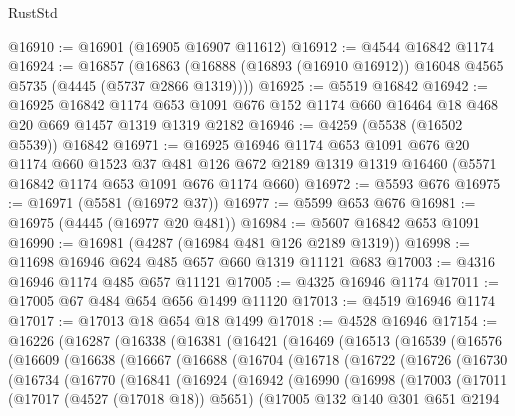 \begin{lexlean}{RustStd}
\begin{coremodule}
{\begin{coremodule}
{{{{{{{{{{{{{{{{{{{{{{{{{{{{{{{{{{{{{{@16910 := @16901 (@16905 @16907 @11612)
@16912 := @4544 @16842 @1174
@16924 := @16857
    (@16863 (@16888 (@16893 (@16910 @16912)) @16048 @4565 @5735 (@4445 (@5737 @2866 @1319))))
@16925 := @5519 @16842
@16942 := @16925
    @16842
    @1174
    @653
    @1091
    @676
    @152
    @1174
    @660
    @16464
    @18
    @468
    @20
    @669
    @1457
    @1319
    @1319
    @2182
@16946 := @4259 (@5538 (@16502 @5539)) @16842
@16971 := @16925
    @16946
    @1174
    @653
    @1091
    @676
    @20
    @1174
    @660
    @1523
    @37
    @481
    @126
    @672
    @2189
    @1319
    @1319
    @16460
    (@5571 @16842 @1174 @653 @1091 @676 @1174 @660)
@16972 := @5593 @676
@16975 := @16971 (@5581 (@16972 @37))
@16977 := @5599 @653 @676
@16981 := @16975 (@4445 (@16977 @20 @481))
@16984 := @5607 @16842 @653 @1091
@16990 := @16981 (@4287 (@16984 @481 @126 @2189 @1319))
@16998 := @11698 @16946 @624 @485 @657 @660 @1319 @11121 @683
@17003 := @4316 @16946 @1174 @485 @657 @11121
@17005 := @4325 @16946 @1174
@17011 := @17005 @67 @484 @654 @656 @1499 @11120
@17013 := @4519 @16946 @1174
@17017 := @17013 @18 @654 @18 @1499
@17018 := @4528 @16946
@17154 := @16226
    (@16287
      (@16338
        (@16381
          (@16421
            (@16469
              (@16513
                (@16539
                  (@16576
                    (@16609
                      (@16638
                        (@16667
                          (@16688
                            (@16704
                              (@16718
                                (@16722
                                  (@16726
                                    (@16730
                                      (@16734
                                        (@16770
                                          (@16841
                                            (@16924
                                              (@16942
                                                (@16990
                                                  (@16998
                                                    (@17003
                                                      (@17011
                                                        (@17017 (@4527 (@17018 @18)) @5651)
                                                        (@17005
                                                          @132
                                                          @140
                                                          @301
                                                          @651
                                                          @2194
}}}}}}}}}}}}}}}}}}}}}}}}}}}}}}}}}}}}}}
\end{coremodule}}
\end{coremodule}
\end{lexlean}
